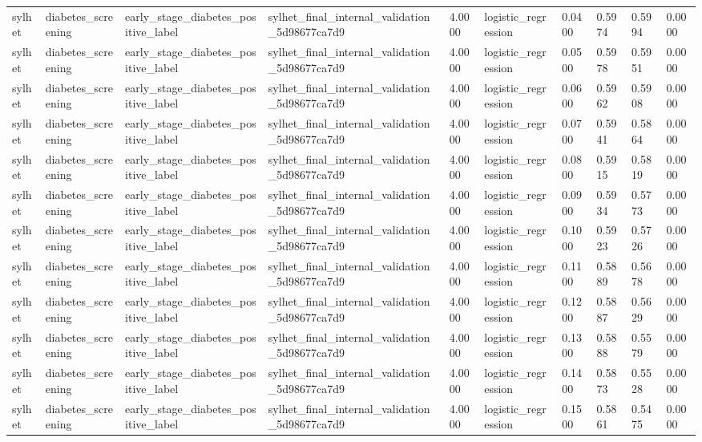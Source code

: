 \begin{tabular}{llllllllll}
sylhet & diabetes\_screening & early\_stage\_diabetes\_positive\_label & sylhet\_final\_internal\_validation\_5d98677ca7d9 & 4.0000 & logistic\_regression & 0.0400 & 0.5974 & 0.5994 & 0.0000 \\
sylhet & diabetes\_screening & early\_stage\_diabetes\_positive\_label & sylhet\_final\_internal\_validation\_5d98677ca7d9 & 4.0000 & logistic\_regression & 0.0500 & 0.5978 & 0.5951 & 0.0000 \\
sylhet & diabetes\_screening & early\_stage\_diabetes\_positive\_label & sylhet\_final\_internal\_validation\_5d98677ca7d9 & 4.0000 & logistic\_regression & 0.0600 & 0.5962 & 0.5908 & 0.0000 \\
sylhet & diabetes\_screening & early\_stage\_diabetes\_positive\_label & sylhet\_final\_internal\_validation\_5d98677ca7d9 & 4.0000 & logistic\_regression & 0.0700 & 0.5941 & 0.5864 & 0.0000 \\
sylhet & diabetes\_screening & early\_stage\_diabetes\_positive\_label & sylhet\_final\_internal\_validation\_5d98677ca7d9 & 4.0000 & logistic\_regression & 0.0800 & 0.5915 & 0.5819 & 0.0000 \\
sylhet & diabetes\_screening & early\_stage\_diabetes\_positive\_label & sylhet\_final\_internal\_validation\_5d98677ca7d9 & 4.0000 & logistic\_regression & 0.0900 & 0.5934 & 0.5773 & 0.0000 \\
sylhet & diabetes\_screening & early\_stage\_diabetes\_positive\_label & sylhet\_final\_internal\_validation\_5d98677ca7d9 & 4.0000 & logistic\_regression & 0.1000 & 0.5923 & 0.5726 & 0.0000 \\
sylhet & diabetes\_screening & early\_stage\_diabetes\_positive\_label & sylhet\_final\_internal\_validation\_5d98677ca7d9 & 4.0000 & logistic\_regression & 0.1100 & 0.5889 & 0.5678 & 0.0000 \\
sylhet & diabetes\_screening & early\_stage\_diabetes\_positive\_label & sylhet\_final\_internal\_validation\_5d98677ca7d9 & 4.0000 & logistic\_regression & 0.1200 & 0.5887 & 0.5629 & 0.0000 \\
sylhet & diabetes\_screening & early\_stage\_diabetes\_positive\_label & sylhet\_final\_internal\_validation\_5d98677ca7d9 & 4.0000 & logistic\_regression & 0.1300 & 0.5888 & 0.5579 & 0.0000 \\
sylhet & diabetes\_screening & early\_stage\_diabetes\_positive\_label & sylhet\_final\_internal\_validation\_5d98677ca7d9 & 4.0000 & logistic\_regression & 0.1400 & 0.5873 & 0.5528 & 0.0000 \\
sylhet & diabetes\_screening & early\_stage\_diabetes\_positive\_label & sylhet\_final\_internal\_validation\_5d98677ca7d9 & 4.0000 & logistic\_regression & 0.1500 & 0.5861 & 0.5475 & 0.0000 \\

\end{tabular}
